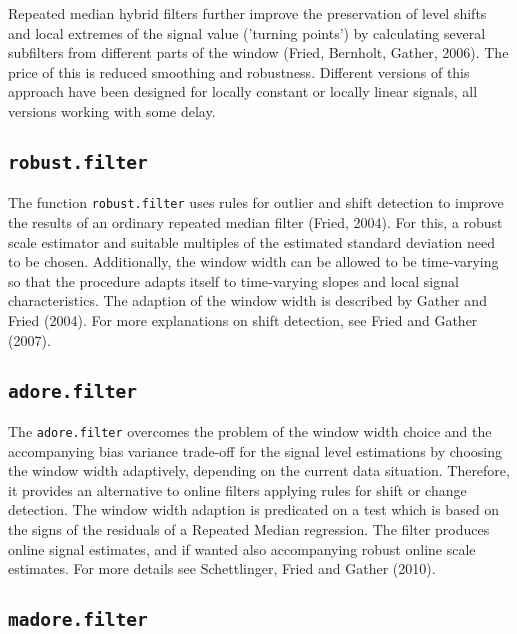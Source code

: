 \documentclass[a4paper]{scrartcl}
\begin{document}
Repeated median hybrid filters further improve the preservation of
level shifts and local extremes of the signal value ('turning
points') by calculating several subfilters from different parts of
the window (Fried, Bernholt, Gather, 2006). The price of this is
reduced smoothing and robustness. Different versions of this
approach have been designed for locally constant or locally linear
signals, all versions working with some delay.

\subsection{\texttt{robust.filter}}

The function \texttt{robust.filter} uses rules for outlier and
shift detection to improve the results of an ordinary repeated
median filter (Fried, 2004). For this, a robust scale estimator
and suitable multiples of the estimated standard deviation need to
be chosen. Additionally, the window width can be allowed to be
time-varying so that the procedure adapts itself to time-varying
slopes and local signal characteristics. The adaption of the
window width is described by Gather and Fried (2004). For more
explanations on shift detection, see Fried and Gather (2007).

\subsection{\texttt{adore.filter}}

The \texttt{adore.filter} overcomes the problem of the window width choice and the accompanying bias variance trade-off for the signal level estimations by choosing the window width adaptively, depending on the current data situation. 
Therefore, it provides an alternative to online filters applying rules for shift or change detection. The window width adaption is predicated on a test which is based on the signs of the residuals of a Repeated Median regression. The filter produces online signal estimates, and if wanted also accompanying robust online scale estimates. For more details see Schettlinger, Fried and Gather (2010).

\subsection{\texttt{madore.filter}}
\end{document}
